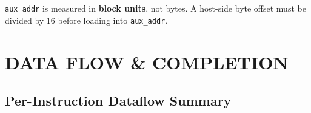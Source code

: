 \documentclass[11pt,a4paper,twoside,openany]{report}
\begin{document}
\begin{CautionBox}
\texttt{aux\_addr} is measured in \textbf{block units}, not bytes.
A host-side byte offset must be divided by 16 before loading into
\texttt{aux\_addr}.
\end{CautionBox}

\newpage

\chapter{DATA FLOW \& COMPLETION}

\section{Per-Instruction Dataflow Summary}
\end{document}
